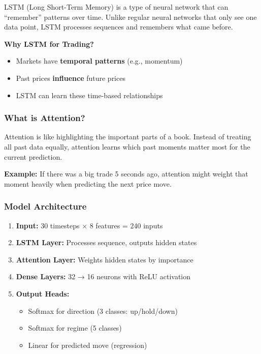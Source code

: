 \documentclass[12pt,a4paper]{article}
\begin{document}
\begin{importantbox}
LSTM (Long Short-Term Memory) is a type of neural network that can ``remember'' patterns over time. Unlike regular neural networks that only see one data point, LSTM processes sequences and remembers what came before.
\end{importantbox}

\textbf{Why LSTM for Trading?}
\begin{itemize}
    \item Markets have \textbf{temporal patterns} (e.g., momentum)
    \item Past prices \textbf{influence} future prices
    \item LSTM can learn these time-based relationships
\end{itemize}

\subsubsection{What is Attention?}

\begin{importantbox}
Attention is like highlighting the important parts of a book. Instead of treating all past data equally, attention learns which past moments matter most for the current prediction.
\end{importantbox}

\textbf{Example:} If there was a big trade 5 seconds ago, attention might weight that moment heavily when predicting the next price move.

\subsubsection{Model Architecture}

\begin{enumerate}
    \item \textbf{Input:} 30 timesteps × 8 features = 240 inputs
    \item \textbf{LSTM Layer:} Processes sequence, outputs hidden states
    \item \textbf{Attention Layer:} Weights hidden states by importance
    \item \textbf{Dense Layers:} 32 → 16 neurons with ReLU activation
    \item \textbf{Output Heads:}
    \begin{itemize}
        \item Softmax for direction (3 classes: up/hold/down)
        \item Softmax for regime (5 classes)
        \item Linear for predicted move (regression)
    \end{itemize}
\end{enumerate}
\end{document}
